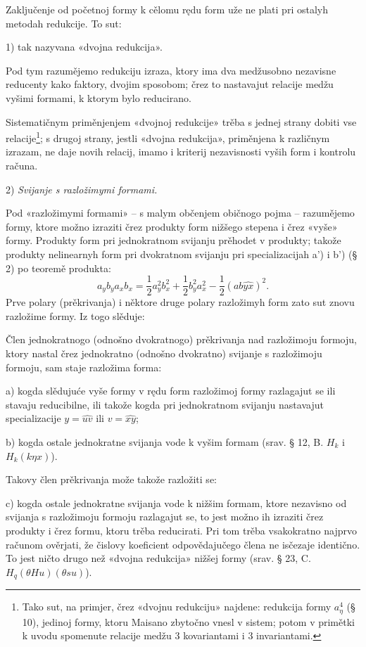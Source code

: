 \documentclass[11pt]{article}
\begin{document}
Zaključenje od početnoj formy k cělomu rędu form uže ne plati pri ostalyh metodah redukcije. To sut:

1) tak nazyvana «dvojna redukcija».

Pod tym razumějemo redukciju izraza, ktory ima dva medžusobno nezavisne reducenty kako faktory, dvojim sposobom; črez to nastavajut relacije medžu vyšimi formami, k ktorym bylo reducirano.

Sistematičnym priměnjenjem «dvojnoj redukcije» trěba s jednej strany dobiti vse relacije\footnote{Tako sut, na primjer, črez «dvojnu redukciju» najdene: redukcija formy $a_\eta^4$ (§ 10), jedinoj formy, ktoru Maisano zbytočno vnesl v sistem; potom v primětki k uvodu spomenute relacije medžu 3 kovariantami i 3 invariantami.}; s drugoj strany, jestli «dvojna redukcija», priměnjena k različnym izrazam, ne daje novih relacij, imamo i kriterij nezavisnosti vyših form i kontrolu računa.

2) {\itshape Svijanje s razložimymi formami.}

Pod «razložimymi formami» -- s malym občenjem običnogo pojma -- razumějemo formy, ktore možno izraziti črez produkty form nižšego stepena i črez «vyše» formy. Produkty form pri jednokratnom svijanju prěhodet v produkty; takože produkty nelinearnyh form pri dvokratnom svijanju pri specializacijah a') i b') (§ 2) po teoremě produkta:
\[
a_yb_y a_xb_x=\frac12a_y^2b_x^2+\frac12b_y^2a_x^2-\frac12(ab\widehat{yx})^2.
\]
Prve polary (prěkrivanja) i něktore druge polary razložimyh form zato sut znovu razložime formy. Iz togo slěduje:

Člen jednokratnogo (odnošno dvokratnogo) prěkrivanja nad razložimoju formoju, ktory nastal črez jednokratno (odnošno dvokratno) svijanje s razložimoju formoju, sam staje razložima forma:

a) kogda slědujuće vyše formy v rędu form razložimoj formy razlagajut se ili stavaju reducibilne, ili takože kogda pri jednokratnom svijanju nastavajut specializacije $y=\widehat{uv}$ ili $v=\widehat{xy}$;

b) kogda ostale jednokratne svijanja vode k vyšim formam (srav. § 12, B. $H_k$ i $H_k(k\eta x)$).

Takovy člen prěkrivanja može takože razložiti se:

c) kogda ostale jednokratne svijanja vode k nižšim formam, ktore nezavisno od svijanja s razložimoju formoju razlagajut se, to jest možno ih izraziti črez produkty i črez formu, ktoru trěba reducirati. Pri tom trěba vsakokratno najprvo računom ověrjati, že čislovy koeficient odpovědajučego člena ne isčezaje identično. To jest ničto drugo než «dvojna redukcija» nižšej formy (srav. § 23, C. $H_q(\theta H u)(\theta s u)$).
\end{document}
